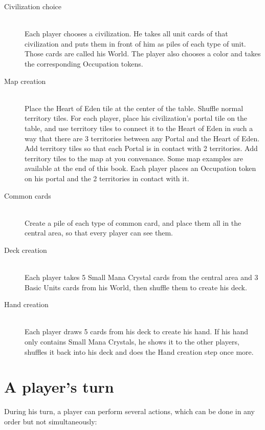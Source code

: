 \documentclass[a4paper]{article}
\begin{document}
    \begin{description}
        \item[Civilization choice] \hfill \\
            Each player chooses a civilization.
            He takes all unit cards of that civilization and puts them in front of him as piles of each type of unit.
            Those cards are called his World.
            The player also chooses a color and takes the corresponding Occupation tokens.
        \item[Map creation] \hfill \\
            Place the Heart of Eden tile at the center of the table.
            Shuffle normal territory tiles.
            For each player, place his civilization's portal tile on the table, and use territory tiles
            to connect it to the Heart of Eden in such a way that there are 3 territories between any Portal and the Heart of Eden.
            Add territory tiles so that each Portal is in contact with 2 territories.
            Add territory tiles to the map at you convenance. Some map examples are available at the end of this book.
            Each player places an Occupation token on his portal and the 2 territories in contact with it.
        \item[Common cards] \hfill \\
            Create a pile of each type of common card, and place them all in the central area, so that
            every player can see them.
        \item[Deck creation] \hfill \\
            Each player takes 5 Small Mana Crystal cards from the central area and
            3 Basic Units cards from his World, then shuffle them to create his deck.
        \item[Hand creation] \hfill \\
            Each player draws 5 cards from his deck to create his hand.
            If his hand only contains Small Mana Crystals, he shows it to the other players, shuffles it back into his deck
            and does the Hand creation step once more.
    \end{description}



\section{A player's turn}

    During his turn, a player can perform several actions, which can be done in any order but not simultaneously:
\end{document}
